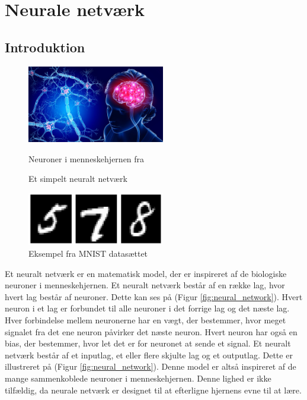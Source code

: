 \documentclass{article}
\newcommand{\figureref}[1]{(Figur \ref{#1})}
\begin{document}
\section{Neurale netværk}
\subsection{Introduktion}
\begin{figure}
  \vspace{-0.5cm}
  \includegraphics[width=6cm]{neurons.jpg}
  \vspace{-0.5cm}
  \caption{Neuroner i menneskehjernen fra \parencite{St_Clair_2021}}
  \label{fig:neurons}
  \vspace{0.5cm}
  
  \vspace{-0.5cm}
  \caption{Et simpelt neuralt netværk}
  \label{fig:neural_network}
  \vspace{0.5cm}
  \includegraphics[width=6cm]{mnist1.jpg}
  \vspace{-0.5cm}
  \caption{Eksempel fra MNIST datasættet \parencite{LeCun_1994}}
  \label{fig:mnist}
\end{figure}
Et neuralt netværk er en matematisk model, der er inspireret af de biologiske neuroner i menneskehjernen. Et neuralt netværk består af en række lag, hvor hvert lag består af neuroner. Dette kan ses på \figureref{fig:neural_network}. Hvert neuron i et lag er forbundet til alle neuroner i det forrige lag og det næste lag. Hver forbindelse mellem neuronerne har en vægt, der bestemmer, hvor meget signalet fra det ene neuron påvirker det næste neuron. Hvert neuron har også en bias, der bestemmer, hvor let det er for neuronet at sende et signal. Et neuralt netværk består af et \color{red!90}inputlag\color{black}, et eller flere \color{violet!90}skjulte lag \color{black} og et \color{blue!90}outputlag\color{black}. Dette er illustreret på \figureref{fig:neural_network}. Denne model er altså inspireret af de mange sammenkoblede neuroner i menneskehjernen. Denne lighed er ikke tilfældig, da neurale netværk er designet til at efterligne hjernens evne til at lære. \parencite{sanderson2017neural}\vspace{5mm}\\
\end{document}
